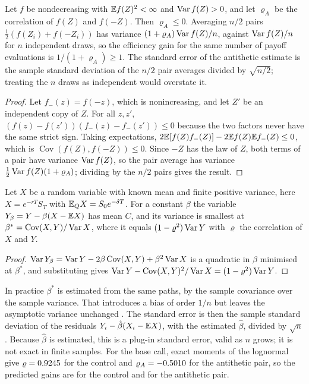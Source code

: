 \begin{chapterrefs}
\begin{proposition}\label{prop5:anti}
Let $f$ be nondecreasing with $\mathbb{E} f(Z)^2<\infty$ and $\operatorname{Var} f(Z)>0$, and let $\varrho_A$ be the correlation of $f(Z)$ and
$f(-Z)$. Then $\varrho_A\le0$. Averaging $n/2$ pairs $\tfrac12(f(Z_i)+f(-Z_i))$ has variance
$(1+\varrho_A)\operatorname{Var} f(Z)/n$, against $\operatorname{Var} f(Z)/n$ for $n$ independent draws, so the efficiency gain for
the same number of payoff evaluations is $1/(1+\varrho_A)\ge1$. The standard error of the
antithetic estimate is the sample standard deviation of the $n/2$ pair averages divided by
$\sqrt{n/2}$; treating the $n$ draws as independent would overstate it.
\end{proposition}

\begin{proof}
Let $f_-(z)=f(-z)$, which is nonincreasing, and let $Z'$ be an
independent copy of $Z$. For all $z,z'$, $(f(z)-f(z'))(f_-(z)-f_-(z'))\le0$ because the two factors never
have the same strict sign. Taking expectations, $2\mathbb{E}[f(Z)f_-(Z)]-2\mathbb{E} f(Z)\mathbb{E} f_-(Z)\le0$, which is
$\operatorname{Cov}(f(Z),f(-Z))\le0$. Since $-Z$ has the law of $Z$, both terms of a pair have
variance $\operatorname{Var} f(Z)$, so the pair average has variance $\tfrac12\operatorname{Var} f(Z)(1+\varrho_A)$; dividing by the
$n/2$ pairs gives the result.
\end{proof}

\begin{proposition}\label{prop5:cv}
Let $X$ be a random variable with known mean and finite positive variance, here $X=e^{-rT}S_T$ with $\mathbb{E}_QX=S_0e^{-\delta T}$. For a
constant $\beta$ the variable $Y_\beta=Y-\beta(X-\mathbb{E} X)$ has mean $C$, and its variance is smallest at
$\beta^*=\operatorname{Cov}(X,Y)/\operatorname{Var} X$, where it equals $(1-\varrho^2)\operatorname{Var} Y$ with $\varrho$ the correlation of
$X$ and $Y$.
\end{proposition}

\begin{proof}
$\operatorname{Var} Y_\beta=\operatorname{Var} Y-2\beta\operatorname{Cov}(X,Y)+\beta^2\operatorname{Var} X$ is a quadratic in $\beta$ minimised at $\beta^*$, and
substituting gives $\operatorname{Var} Y-\operatorname{Cov}(X,Y)^2/\operatorname{Var} X=(1-\varrho^2)\operatorname{Var} Y$.
\end{proof}

In practice $\beta^*$ is estimated from the same paths, by the sample covariance over the sample
variance. That introduces a bias of order $1/n$ but leaves the asymptotic variance unchanged
\parencite[Section 4.1]{glasserman2003}. The standard error is then the sample standard deviation of
the residuals $Y_i-\hat\beta(X_i-\mathbb{E} X)$, with the estimated $\hat\beta$, divided by $\sqrt n$. Because
$\hat\beta$ is estimated, this is a plug-in standard error, valid as $n$ grows; it is not exact in
finite samples. For the
base call, exact moments of the lognormal give $\varrho=0.9245$ for the control and
$\varrho_A=-0.5010$ for the antithetic pair, so the predicted gains are \vrCVTheory{} for the control and
\vrAntiTheory{} for the antithetic pair.


\end{chapterrefs}
